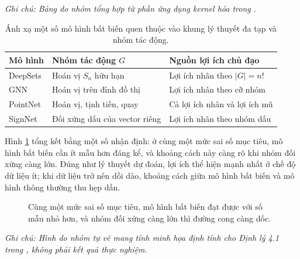 \begin{table}[H]
    \centering
    \caption{Ánh xạ một số mô hình bất biến quen thuộc vào khung lý thuyết đa tạp và nhóm tác động.}
    \label{tab:applications}
    \vspace{2pt}
    \textit{Ghi chú: Bảng do nhóm tổng hợp từ phần ứng dụng kernel hóa trong \cite{tahmasebi2023exact}.}
    \vspace{4pt}
    \begin{tabular}{lll}
        \hline
        \rowcolor{gray!20}
        Mô hình & Nhóm tác động $G$ & Nguồn lợi ích chủ đạo \\
        \hline
        DeepSets & Hoán vị $S_n$ hữu hạn & Lợi ích nhân theo $|G| = n!$ \\
        GNN & Hoán vị trên đỉnh đồ thị & Lợi ích nhân theo cỡ nhóm \\
        PointNet & Hoán vị, tịnh tiến, quay & Cả lợi ích nhân và lợi ích mũ \\
        SignNet & Đối xứng dấu của vector riêng & Lợi ích nhân theo nhóm dấu \\
        \hline
    \end{tabular}
\end{table}
 
Hình \ref{fig:error-curve} tổng kết bằng một số nhận định: ở cùng một mức sai số mục tiêu, mô hình bất biến cần ít mẫu hơn đáng kể, và khoảng cách này càng rõ khi nhóm đối xứng càng lớn. Đúng như lý thuyết dự đoán, lợi ích thể hiện mạnh nhất ở chế độ dữ liệu ít; khi dữ liệu trở nên dồi dào, khoảng cách giữa mô hình bất biến và mô hình thông thường thu hẹp dần.
 
\begin{figure}[H]
    \centering
    \caption{Cùng một mức sai số mục tiêu, mô hình bất biến đạt được với số mẫu nhỏ hơn, và nhóm đối xứng càng lớn thì đường cong càng dốc.}
    \label{fig:error-curve}
    \vspace{2mm}
\end{figure}
\vspace{-2.0em}
\noindent\textit{Ghi chú: Hình do nhóm tự vẽ mang tính minh họa định tính cho Định lý 4.1 trong \cite{tahmasebi2023exact}, không phải kết quả thực nghiệm.}

